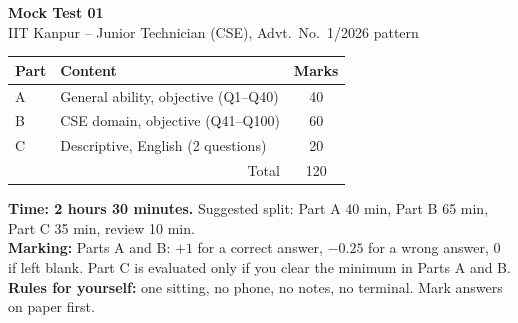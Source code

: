 \documentclass[11pt,a4paper]{article}
\begin{document}
\begin{center}
{\LARGE\bfseries\color{slate}Mock Test 01}\\[4pt]
{\large IIT Kanpur -- Junior Technician (CSE), Advt.\ No.\ 1/2026 pattern}\\[6pt]
\begin{tabular}{|l|l|c|}\hline
\textbf{Part} & \textbf{Content} & \textbf{Marks}\\\hline
A & General ability, objective (Q1--Q40) & 40\\
B & CSE domain, objective (Q41--Q100) & 60\\
C & Descriptive, English (2 questions) & 20\\\hline
\multicolumn{2}{|r|}{Total} & 120\\\hline
\end{tabular}
\end{center}
\textbf{Time: 2 hours 30 minutes.} Suggested split: Part A 40 min, Part B 65 min, Part C 35 min, review 10 min.\\
\textbf{Marking:} Parts A and B: $+1$ for a correct answer, $-0.25$ for a wrong answer, 0 if left blank.
Part C is evaluated only if you clear the minimum in Parts A and B.\\
\textbf{Rules for yourself:} one sitting, no phone, no notes, no terminal. Mark answers on paper first.
\end{document}
